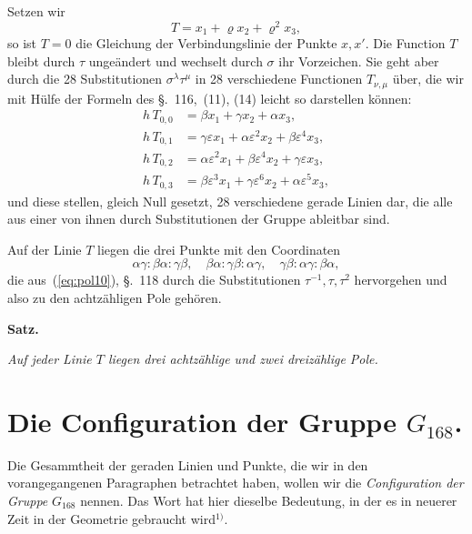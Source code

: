 \documentclass[12pt,a4paper]{article}
\begin{document}
Setzen wir
\begin{equation}
\label{eq:T} T = x_1 + \varrho x_2 + \varrho^2 x_3,
\end{equation}
so ist $T = 0$ die Gleichung der Verbindungslinie der Punkte $x, x'$. Die Function $T$ bleibt durch $\tau$ unge\"andert und wechselt durch $\sigma$ ihr Vorzeichen. Sie geht aber durch die 28 Substitutionen $\sigma^{\lambda}\tau^{\mu}$ in 28 verschiedene Functionen $T_{\nu,\mu}$ \"uber, die wir mit H\"ulfe der Formeln des \S.~116,~(11), (14) leicht so darstellen k\"onnen:
\begin{equation}
\label{eq:Tformeln} \begin{aligned}
h\,T_{0,0} &= \beta x_1 + \gamma x_2 + \alpha x_3,\\
h\,T_{0,1} &= \gamma\varepsilon x_1 + \alpha\varepsilon^2 x_2 + \beta\varepsilon^4 x_3,\\
h\,T_{0,2} &= \alpha\varepsilon^2 x_1 + \beta\varepsilon^4 x_2 + \gamma\varepsilon x_3,\\
h\,T_{0,3} &= \beta\varepsilon^3 x_1 + \gamma\varepsilon^6 x_2 + \alpha\varepsilon^5 x_3,
\end{aligned}
\end{equation}
und diese stellen, gleich Null gesetzt, 28 verschiedene gerade Linien dar, die alle aus einer von ihnen durch Substitutionen der Gruppe ableitbar sind.

Auf der Linie $T$ liegen die drei Punkte mit den Coordinaten
\[\alpha\gamma : \beta\alpha : \gamma\beta, \quad \beta\alpha : \gamma\beta : \alpha\gamma, \quad \gamma\beta : \alpha\gamma : \beta\alpha,\]
die aus~(\ref{eq:pol10}), \S.~118 durch die Substitutionen $\tau^{-1}, \tau, \tau^2$ hervorgehen und also zu den achtz\"ahligen Pole geh\"oren.

\begin{center}\textbf{Satz.}\end{center}
\textit{Auf jeder Linie $T$ liegen drei achtz\"ahlige und zwei dreiz\"ahlige Pole.}

\newpage
\section{Die Configuration der Gruppe $G_{168}$.}
\label{sec:120}

Die Gesammtheit der geraden Linien und Punkte, die wir in den vorangegangenen Paragraphen betrachtet haben, wollen wir die \textit{Configuration der Gruppe} $G_{168}$ nennen. Das Wort hat hier dieselbe Bedeutung, in der es in neuerer Zeit in der Geometrie gebraucht wird$^{1)}$.
\end{document}
